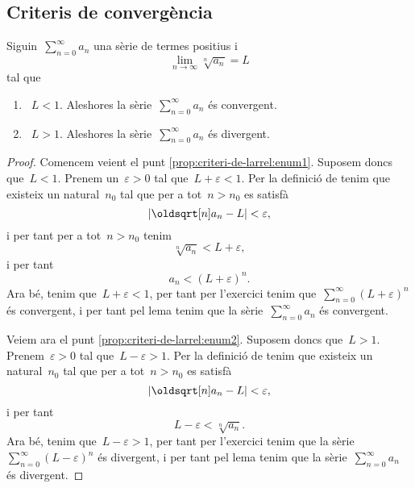 \documentclass[../analisi-matematica.tex]{subfiles}
\begin{document}
    \subsection{Criteris de convergència}
    \begin{proposition}
        \label{prop:criteri-de-larrel}
        Siguin~\(\sum_{n=0}^{\infty}a_{n}\) una sèrie de termes positius i
        \[
            \lim_{n\to\infty}\sqrt[n]{a_{n}}=L
        \]
        tal que
        \begin{enumerate}
            \item\label{prop:criteri-de-larrel:enum1}~\(L<1\).
            Aleshores la sèrie~\(\sum_{n=0}^{\infty}a_{n}\) és convergent.
            \item\label{prop:criteri-de-larrel:enum2}~\(L>1\).
            Aleshores la sèrie~\(\sum_{n=0}^{\infty}a_{n}\) és divergent.
        \end{enumerate}
    \end{proposition}
    \begin{proof}
        Comencem veient el punt \eqref{prop:criteri-de-larrel:enum1}.
         Suposem doncs que~\(L<1\).
        Prenem un~\(\varepsilon>0\) tal que~\(L+\varepsilon<1\).
        Per la definició de  tenim que existeix un natural~\(n_{0}\) tal que per a tot~\(n>n_{0}\) es satisfà
        \[
            \abs{\sqrt[n]{a_{n}}-L}<\varepsilon,
        \]
        i per tant per a tot~\(n>n_{0}\) tenim
        \[
            \sqrt[n]{a_{n}}<L+\varepsilon,
        \]
        i per tant
        \[
            a_{n}<\left(L+\varepsilon\right)^{n}.
        \]
        Ara bé, tenim que~\(L+\varepsilon<1\), per tant per l'exercici  tenim que~\(\sum_{n=0}^{\infty}(L+\varepsilon)^{n}\) és convergent, i per tant pel lema  tenim que la sèrie~\(\sum_{n=0}^{\infty}a_{n}\) és convergent.

        Veiem ara el punt \eqref{prop:criteri-de-larrel:enum2}.
        Suposem doncs que~\(L>1\).
        Prenem~\(\varepsilon>0\) tal que~\(L-\varepsilon>1\).
        Per la definició de  tenim que existeix un natural~\(n_{0}\) tal que per a tot~\(n>n_{0}\) es satisfà
        \[
            \abs{\sqrt[n]{a_{n}}-L}<\varepsilon,
        \]
        i per tant
        \[
            L-\varepsilon<\sqrt[n]{a_{n}}.
        \]
        Ara bé, tenim que~\(L-\varepsilon>1\), per tant per l'exercici  tenim que la sèrie~\(\sum_{n=0}^{\infty}(L-\varepsilon)^{n}\) és divergent, i per tant pel lema  tenim que la sèrie~\(\sum_{n=0}^{\infty}a_{n}\) és divergent.
    \end{proof}
\end{document}
